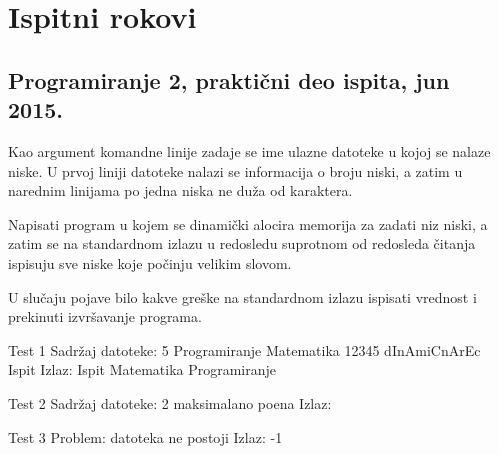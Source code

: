 
\chapter{Ispitni rokovi}


\section{Programiranje 2, praktični deo ispita, jun 2015.}


\begin{Exercise}[label=901]

Kao argument komandne linije zadaje se ime ulazne datoteke u kojoj se nalaze niske. U prvoj liniji datoteke nalazi se informacija o broju niski, a zatim u narednim linijama po jedna niska ne duža od  karaktera.
  
Napisati program u kojem se dinamički alocira memorija za zadati niz niski, a zatim se na standardnom izlazu u redosledu suprotnom od redosleda čitanja ispisuju sve niske koje počinju velikim slovom. 

U slučaju pojave bilo kakve greške na standardnom izlazu ispisati vrednost  i prekinuti izvršavanje programa.

\begin{minitest}
\begin{test}{Test 1}
Sadržaj datoteke:  
 5                             
 Programiranje	                               
 Matematika		                         
 12345
 dInAmiCnArEc
 Ispit
Izlaz:           
 Ispit                                                                
 Matematika
 Programiranje
\end{test}
\end{minitest}
\begin{minitest}
\begin{test}{Test 2}
Sadržaj datoteke:               
  2                                             
  maksimalano               
  poena
Izlaz: 
\end{test}
\end{minitest}
\begin{minitest}
\begin{test}{Test 3}
Problem: 
  datoteka 
   ne postoji
Izlaz:    
  -1       
\end{test}
\end{minitest}

\end{Exercise}
\begin{Answer}[ref=901]
\end{Answer}


